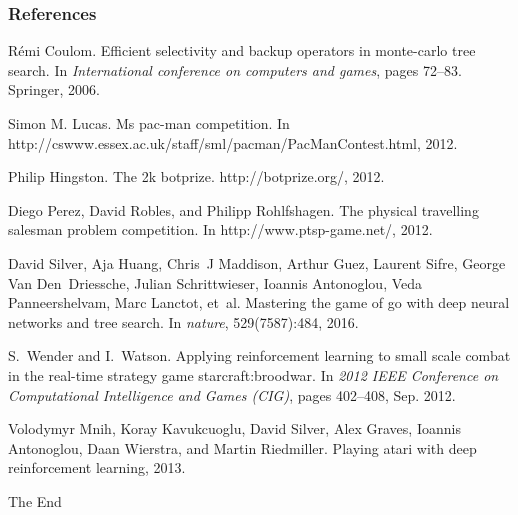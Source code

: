 \documentclass{beamer}
\begin{document}
\begin{frame}[allowframebreaks]
\frametitle{References}
\footnotesize{
\begin{thebibliography}{99} %
    R{\'e}mi Coulom.
    \newblock Efficient selectivity and backup operators in monte-carlo tree search.
    \newblock In {\em International conference on computers and games}, pages 72--83. Springer, 2006.

    Simon M. Lucas. 
    \newblock Ms pac-man competition. 
    \newblock In http://cswww.essex.ac.uk/staff/sml/pacman/PacManContest.html, 2012.

    Philip Hingston.
    \newblock The 2k botprize.
    \newblock http://botprize.org/, 2012.

    Diego Perez, David Robles, and Philipp Rohlfshagen. 
    \newblock The physical travelling salesman problem competition. 
    \newblock In http://www.ptsp-game.net/, 2012. 
    
    David Silver, Aja Huang, Chris~J Maddison, Arthur Guez, Laurent Sifre, George Van Den~Driessche, Julian Schrittwieser, Ioannis Antonoglou, Veda Panneershelvam, Marc Lanctot, et~al.
    \newblock Mastering the game of go with deep neural networks and tree search.
    \newblock In {\em nature}, 529(7587):484, 2016.

    S.~{Wender} and I.~{Watson}.
    \newblock Applying reinforcement learning to small scale combat in the real-time strategy game starcraft:broodwar.
    \newblock In {\em 2012 IEEE Conference on Computational Intelligence and Games (CIG)}, pages 402--408, Sep. 2012.

    Volodymyr Mnih, Koray Kavukcuoglu, David Silver, Alex Graves, Ioannis Antonoglou, Daan Wierstra, and Martin Riedmiller.
    \newblock Playing atari with deep reinforcement learning, 2013.
    \end{thebibliography}
}
\end{frame}


\begin{frame}
\Huge{\centerline{The End}}
\end{frame}

\end{document}
